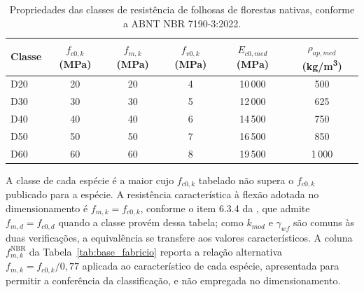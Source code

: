 \begin{appendices}
\begin{table}[!ht]
\centering
\caption{Propriedades das classes de resistência de folhosas de florestas nativas, conforme a ABNT NBR 7190-3:2022.}
\label{tab:classes_madeira}
\footnotesize
\begin{tabular}{lccccc}
\toprule
Classe & $f_{c0,k}$ (MPa) & $f_{m,k}$ (MPa) & $f_{v0,k}$ (MPa) & $E_{c0,med}$ (MPa) & $\rho_{ap,med}$ (kg/m\textsuperscript{3}) \\
\midrule
D20 & 20 & 20 & 4 & 10\,000 & 500 \\
D30 & 30 & 30 & 5 & 12\,000 & 625 \\
D40 & 40 & 40 & 6 & 14\,500 & 750 \\
D50 & 50 & 50 & 7 & 16\,500 & 850 \\
D60 & 60 & 60 & 8 & 19\,500 & 1\,000 \\
\bottomrule
\end{tabular}
\end{table}

\noindent\footnotesize A classe de cada espécie é a maior cujo $f_{c0,k}$ tabelado não supera o $f_{c0,k}$ publicado para a espécie. A resistência característica à flexão adotada no dimensionamento é $f_{m,k}=f_{c0,k}$, conforme o item 6.3.4 da \textcite{NBR7190-1:2022}, que admite $f_{m,d}=f_{c0,d}$ quando a classe provém dessa tabela; como $k_{mod}$ e $\gamma_{wf}$ são comuns às duas verificações, a equivalência se transfere aos valores característicos. A coluna $f_{m,k}^{\mathrm{NBR}}$ da Tabela~\ref{tab:base_fabricio} reporta a relação alternativa $f_{m,k}=f_{c0,k}/0{,}77$ aplicada ao característico de cada espécie, apresentada para permitir a conferência da classificação, e não empregada no dimensionamento.\normalsize

\end{appendices}
